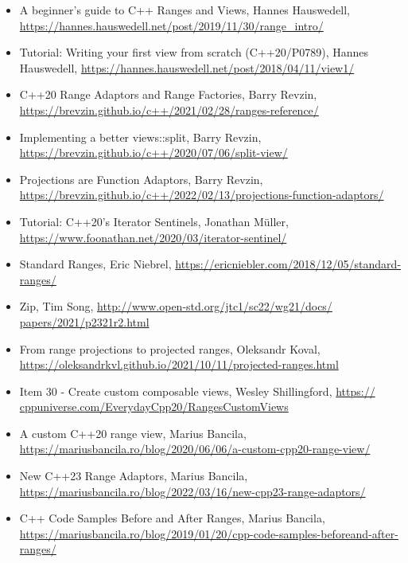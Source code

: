 \begin{itemize}
\item
A beginner’s guide to C++ Ranges and Views, Hannes Hauswedell, \url{https://hannes.hauswedell.net/post/2019/11/30/range_intro/}

\item
Tutorial: Writing your first view from scratch (C++20/P0789), Hannes Hauswedell, \url{https://hannes.hauswedell.net/post/2018/04/11/view1/}

\item
C++20 Range Adaptors and Range Factories, Barry Revzin, \url{https://brevzin.github.io/c++/2021/02/28/ranges-reference/}

\item
Implementing a better views::split, Barry Revzin, \url{https://brevzin.github.io/c++/2020/07/06/split-view/}

\item
Projections are Function Adaptors, Barry Revzin, \url{https://brevzin.github.io/c++/2022/02/13/projections-function-adaptors/}

\item
Tutorial: C++20’s Iterator Sentinels, Jonathan Müller, \url{https://www.foonathan.net/2020/03/iterator-sentinel/}

\item
Standard Ranges, Eric Niebrel, \url{https://ericniebler.com/2018/12/05/standard-ranges/}

\item
Zip, Tim Song, \url{http://www.open-std.org/jtc1/sc22/wg21/docs/ papers/2021/p2321r2.html}

\item
From range projections to projected ranges, Oleksandr Koval, \url{https://oleksandrkvl.github.io/2021/10/11/projected-ranges.html}

\item
Item 30 - Create custom composable views, Wesley Shillingford, \url{https:// cppuniverse.com/EverydayCpp20/RangesCustomViews}

\item
A custom C++20 range view, Marius Bancila, \url{https://mariusbancila.ro/blog/2020/06/06/a-custom-cpp20-range-view/}

\item
New C++23 Range Adaptors, Marius Bancila, \url{https://mariusbancila.ro/blog/2022/03/16/new-cpp23-range-adaptors/}

\item
C++ Code Samples Before and After Ranges, Marius Bancila, \url{https://mariusbancila.ro/blog/2019/01/20/cpp-code-samples-beforeand-after-ranges/}
\end{itemize}